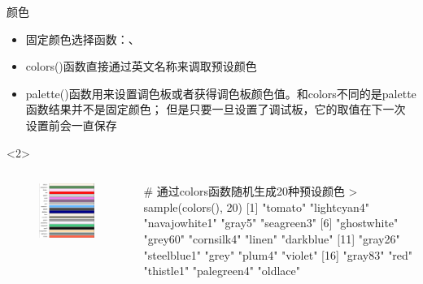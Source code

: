 \documentclass{beamerthemeMono}
\begin{document}
\begin{frame}[t,fragile]{\subsecname}{颜色}
\begin{itemize}
\item<1-> 固定颜色选择函数：、
\item<2-> colors()函数直接通过英文名称来调取预设颜色
\item<3-> palette()函数用来设置调色板或者获得调色板颜色值。和colors不同的是palette函数结果并不是固定颜色；
但是只要一旦设置了调试板，它的取值在下一次设置前会一直保存
\end{itemize}

\begin{overlayarea}{\textwidth}{\textheight}
\begin{onlyenv}<2>
  \begin{columns}
    \begin{column}{.4\textwidth}
\centering
      \begin{figure}
        \includegraphics[width=\columnwidth]{colors-bar.png} 
      \end{figure}
    \end{column}

    \begin{column}{.6\textwidth}
\centering
\begin{rcode}
# 通过colors函数随机生成20种预设颜色
> sample(colors(), 20)
 [1] "tomato"       "lightcyan4"   "navajowhite1" "gray5"        "seagreen3"   
 [6] "ghostwhite"   "grey60"       "cornsilk4"    "linen"        "darkblue"    
[11] "gray26"       "steelblue1"   "grey"         "plum4"        "violet"      
[16] "gray83"       "red"          "thistle1"     "palegreen4"   "oldlace" 
\end{rcode}
    \end{column}
  \end{columns}
\end{onlyenv}


\end{overlayarea}
\end{frame}
\end{document}
